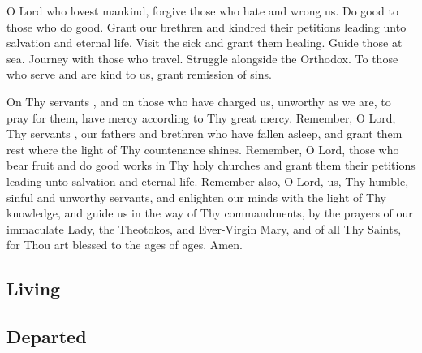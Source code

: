 O Lord who lovest mankind, forgive those who hate and wrong us. Do good to those who do good. Grant our brethren and kindred their petitions leading unto salvation and eternal life. Visit the sick and grant them healing. Guide those at sea. Journey with those who travel. Struggle alongside the Orthodox. To those who serve and are kind to us, grant remission of sins.

On Thy servants , and on those who have charged us, unworthy as we are, to pray for them, have mercy according to Thy great mercy. Remember, O Lord, Thy servants , our fathers and brethren who have fallen asleep, and grant them rest where the light of Thy countenance shines. Remember, O Lord, those who bear fruit and do good works in Thy holy churches and grant them their petitions leading unto salvation and eternal life. Remember also, O Lord, us, Thy humble, sinful and unworthy servants, and enlighten our minds with the light of Thy knowledge, and guide us in the way of Thy commandments, by the prayers of our immaculate Lady, the Theotokos, and Ever-Virgin Mary, and of all Thy Saints, for Thou art blessed to the ages of ages. Amen. 

\cleardoublepage

\subsection{Living}

\cleardoublepage

\subsection{Departed}

\cleardoublepage
